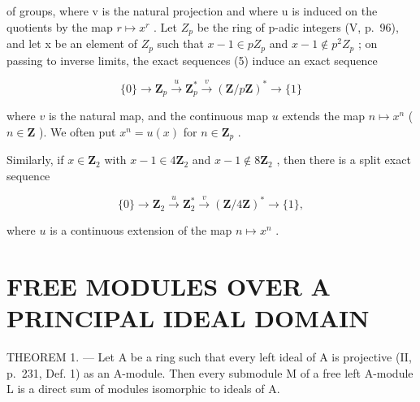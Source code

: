 of groups, where v is the natural projection and where u is induced on the quotients by the map \(r \mapsto x^{r}\) . Let \(Z_{p}\) be the ring of p-adic integers (V, p.~96), and let x be an element of \(Z_{p}\) such that \(x - 1 \in pZ_{p}\) and \(x - 1 \notin p^{2}Z_{p}\) ; on passing to inverse limits, the exact sequences (5) induce an exact sequence

\[
\{0 \} \rightarrow \mathbf {Z} _ {p} \stackrel {u} {\rightarrow} \mathbf {Z} _ {p} ^ {*} \stackrel {v} {\rightarrow} (\mathbf {Z} / p \mathbf {Z}) ^ {*} \rightarrow \{1 \}
\]

where \(v\) is the natural map, and the continuous map \(u\) extends the map \(n \mapsto x^n\) ( \(n \in \mathbf{Z}\) ). We often put \(x^n = u(x)\) for \(n \in \mathbf{Z}_p\) .

Similarly, if \(x \in \mathbf{Z}_2\) with \(x - 1 \in 4\mathbf{Z}_2\) and \(x - 1 \notin 8\mathbf{Z}_2\) , then there is a split exact sequence

\[
\{0 \} \rightarrow \mathbf {Z} _ {2} \stackrel {{u}} {{\rightarrow}} \mathbf {Z} _ {2} ^ {*} \stackrel {{v}} {{\rightarrow}} (\mathbf {Z} / 4 \mathbf {Z}) ^ {*} \rightarrow \{1 \},
\]

where \(u\) is a continuous extension of the map \(n \mapsto x^n\) .

\section{FREE MODULES OVER A PRINCIPAL IDEAL DOMAIN}

THEOREM 1. --- Let A be a ring such that every left ideal of A is projective (II, p.~231, Def. 1) as an A-module. Then every submodule M of a free left A-module L is a direct sum of modules isomorphic to ideals of A.

